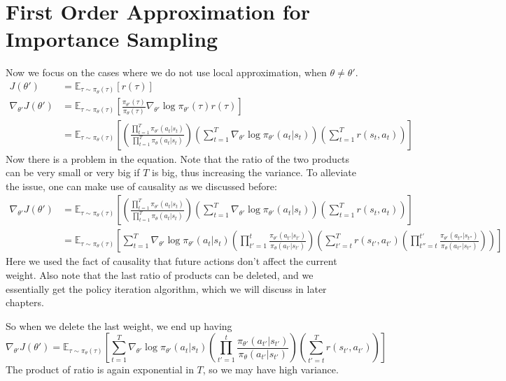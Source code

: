 \section{First Order Approximation for Importance Sampling}
Now we focus on the cases where we do not use local approximation, when $\theta \neq \theta'$.
\begin{align*}
    J(\theta') &= \mathbb{E}_{\tau\sim\pi_\theta(\tau)}\left[r(\tau)\right]\\
    \nabla_{\theta'}J(\theta')&=\mathbb{E}_{\tau\sim\pi_\theta(\tau)}\left[\frac{\pi_{\theta'}(\tau)}{\pi_\theta(\tau)}\nabla_{\theta'}\log\pi_{\theta'}(\tau)r(\tau)\right]\\
    &= \mathbb{E}_{\tau\sim\pi_\theta(\tau)}\left[  \left(  \frac{\prod_{t=1}^T\pi_{\theta'}(a_t|s_t)}{\prod_{t=1}^T\pi_{\theta}(a_t|s_t)} \right)\left( \sum_{t=1}^T\nabla_{\theta'}\log\pi_{\theta'}(a_t|s_t)  \right)\left(\sum_{t=1}^Tr(s_t,a_t)\right)  \right]
\end{align*}
Now there is a problem in the equation. Note that the ratio of the two products can be very small or very big if $T$ is big, thus increasing the variance. To alleviate the issue, one can make use of causality as we discussed before:
\begin{align*}
    \nabla_{\theta'}J(\theta')&= \mathbb{E}_{\tau\sim\pi_\theta(\tau)}\left[  \left(  \frac{\prod_{t=1}^T\pi_{\theta'}(a_t|s_t)}{\prod_{t=1}^T\pi_{\theta}(a_t|s_t)} \right)\left( \sum_{t=1}^T\nabla_{\theta'}\log\pi_{\theta'}(a_t|s_t)  \right)\left(\sum_{t=1}^Tr(s_t,a_t)\right)  \right]\\
    &=\mathbb{E}_{\tau\sim\pi_\theta(\tau)}\left[  \sum_{t=1}^T\nabla_{\theta'}\log\pi_{\theta'}(a_t|s_t) \left(\prod_{t'=1}^t \frac{\pi_{\theta'}(a_{t'}|s_{t'}) }{\pi_{\theta}(a_{t'}|s_{t'})}\right)    \left(  \sum_{t'=t}^Tr(s_{t'},a_{t'})\left(  \prod_{t'' = t}^{t'}\frac{\pi_{\theta'}(a_{t''}|s_{t''}) }{\pi_{\theta}(a_{t''}|s_{t''})} \right)    \right)\right]
\end{align*}
Here we used the fact of causality that future actions don't affect the current weight. Also note that the last ratio of products can be deleted, and we essentially get the policy iteration algorithm, which we will discuss in later chapters. 

So when we delete the last weight, we end up having
$$\nabla_{\theta'}J(\theta')= \mathbb{E}_{\tau\sim\pi_\theta(\tau)}\left[   \sum_{t=1}^T\nabla_{\theta'}\log\pi_{\theta'}(a_t|s_t)    \left(\prod_{t'=1}^t \frac{\pi_{\theta'}(a_{t'}|s_{t'}) }{\pi_{\theta}(a_{t'}|s_{t'})}\right)\left(  \sum_{t'=t}^Tr(s_{t'},a_{t'})\right)\right]$$
The product of ratio is again exponential in $T$, so we may have high variance. 

